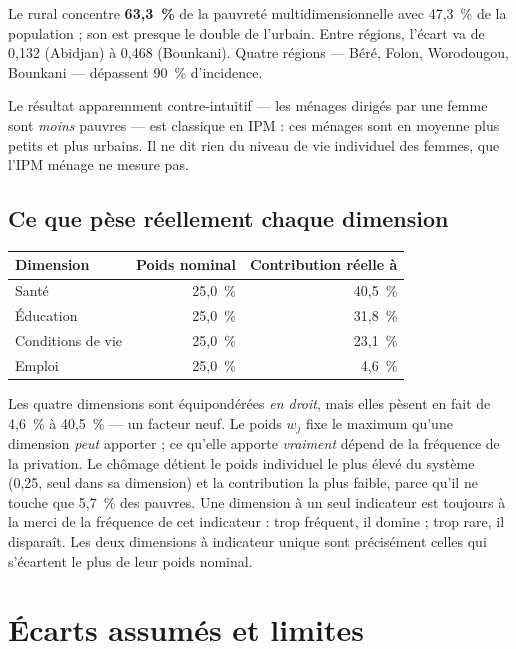 \documentclass[11pt,a4paper]{article}
\begin{document}
Le rural concentre \textbf{63,3~\%} de la pauvreté multidimensionnelle avec 47,3~\% de la
population ; son \ipm{} est presque le double de l'urbain. Entre régions, l'écart va de 0,132
(Abidjan) à 0,468 (Bounkani). Quatre régions --- Béré, Folon, Worodougou, Bounkani --- dépassent
90~\% d'incidence.

Le résultat apparemment contre-intuitif --- les ménages dirigés par une femme sont \emph{moins}
pauvres --- est classique en IPM : ces ménages sont en moyenne plus petits et plus urbains. Il ne
dit rien du niveau de vie individuel des femmes, que l'IPM ménage ne mesure pas.

\subsection{Ce que pèse réellement chaque dimension}

\begin{center}
\begin{tabular}{@{}lrr@{}}
\toprule
\textbf{Dimension} & \textbf{Poids nominal} & \textbf{Contribution réelle à \ipm{}} \\
\midrule
Santé & 25,0~\% & 40,5~\% \\
Éducation & 25,0~\% & 31,8~\% \\
Conditions de vie & 25,0~\% & 23,1~\% \\
Emploi & 25,0~\% & 4,6~\% \\
\bottomrule
\end{tabular}
\end{center}

\begin{attention}
Les quatre dimensions sont équipondérées \emph{en droit}, mais elles pèsent en fait de 4,6~\% à
40,5~\% --- un facteur neuf. Le poids $w_j$ fixe le maximum qu'une dimension \emph{peut}
apporter ; ce qu'elle apporte \emph{vraiment} dépend de la fréquence de la privation. Le chômage
détient le poids individuel le plus élevé du système (0,25, seul dans sa dimension) et la
contribution la plus faible, parce qu'il ne touche que 5,7~\% des pauvres. Une dimension à un seul
indicateur est toujours à la merci de la fréquence de cet indicateur : trop fréquent, il domine ;
trop rare, il disparaît. Les deux dimensions à indicateur unique sont précisément celles qui
s'écartent le plus de leur poids nominal.
\end{attention}

\section{Écarts assumés et limites}
\end{document}
